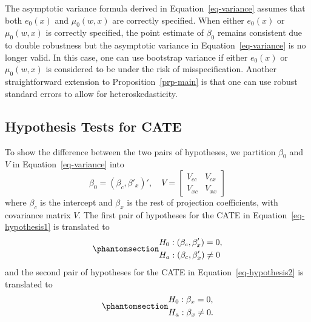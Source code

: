 \documentclass[
  12pt,
  12pt]{article}
\numberwithin{equation}{section}
\theoremstyle{definition}
\theoremstyle{plain}
\theoremstyle{plain}
\theoremstyle{remark}
\begin{document}
The asymptotic variance formula derived in Equation~\ref{eq-variance}
assumes that both \(e_0(x)\) and \(\mu_0(w, x)\) are correctly
specified. When either \(e_0(x)\) or \(\mu_0(w, x)\) is correctly
specified, the point estimate of \(\beta_0\) remains consistent due to
double robustness but the asymptotic variance in
Equation~\ref{eq-variance} is no longer valid. In this case, one can use
bootstrap variance if either \(e_0(x)\) or \(\mu_0(w, x)\) is considered
to be under the risk of misspecification. Another straightforward
extension to Proposition~\ref{prp-main} is that one can use robust
standard errors to allow for heteroskedasticity.

\subsection{Hypothesis Tests for CATE}\label{sec-catetest}

To show the difference between the two pairs of hypotheses, we partition
\(\beta_0\) and \(V\) in Equation~\ref{eq-variance} into \[
\beta_0 = (\beta_c, \beta'_x)', \quad V = \begin{bmatrix} V_{cc} & V_{cx} \\ V_{xc} & V_{xx} \end{bmatrix}
\] where \(\beta_c\) is the intercept and \(\beta_x\) is the rest of
projection coefficients, with covariance matrix \(V\). The first pair of
hypotheses for the CATE in Equation~\ref{eq-hypothesis1} is translated
to \begin{equation}\phantomsection\label{eq-translate1}{
\begin{aligned}
& H_0: (\beta_c, \beta'_x) = 0, \\
& H_a: (\beta_c, \beta'_x) \neq 0
\end{aligned}
}\end{equation} and the second pair of hypotheses for the CATE in
Equation~\ref{eq-hypothesis2} is translated to
\begin{equation}\phantomsection\label{eq-translate2}{
\begin{aligned}
& H_0: \beta_x = 0, \\
& H_a: \beta_x \neq 0.
\end{aligned}
}\end{equation}
\end{document}
